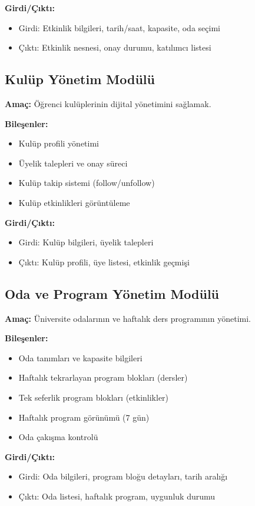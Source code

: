 \documentclass[a4paper,12pt]{report}
\begin{document}
\textbf{Girdi/Çıktı:}
\begin{itemize}
    \item Girdi: Etkinlik bilgileri, tarih/saat, kapasite, oda seçimi
    \item Çıktı: Etkinlik nesnesi, onay durumu, katılımcı listesi
\end{itemize}

\subsection{Kulüp Yönetim Modülü}

\textbf{Amaç:} Öğrenci kulüplerinin dijital yönetimini sağlamak.

\textbf{Bileşenler:}
\begin{itemize}
    \item Kulüp profili yönetimi
    \item Üyelik talepleri ve onay süreci
    \item Kulüp takip sistemi (follow/unfollow)
    \item Kulüp etkinlikleri görüntüleme
\end{itemize}

\textbf{Girdi/Çıktı:}
\begin{itemize}
    \item Girdi: Kulüp bilgileri, üyelik talepleri
    \item Çıktı: Kulüp profili, üye listesi, etkinlik geçmişi
\end{itemize}

\subsection{Oda ve Program Yönetim Modülü}

\textbf{Amaç:} Üniversite odalarının ve haftalık ders programının yönetimi.

\textbf{Bileşenler:}
\begin{itemize}
    \item Oda tanımları ve kapasite bilgileri
    \item Haftalık tekrarlayan program blokları (dersler)
    \item Tek seferlik program blokları (etkinlikler)
    \item Haftalık program görünümü (7 gün)
    \item Oda çakışma kontrolü
\end{itemize}

\textbf{Girdi/Çıktı:}
\begin{itemize}
    \item Girdi: Oda bilgileri, program bloğu detayları, tarih aralığı
    \item Çıktı: Oda listesi, haftalık program, uygunluk durumu
\end{itemize}
\end{document}
